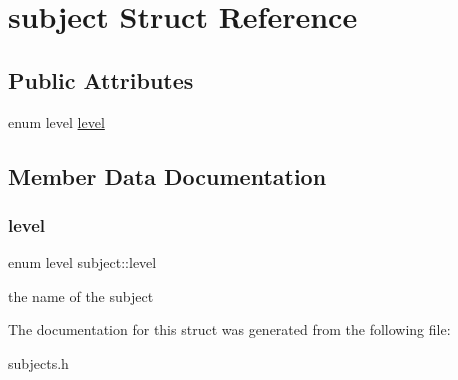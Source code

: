 \hypertarget{structsubject}{}\section{subject Struct Reference}
\label{structsubject}
\subsection*{Public Attributes}
\begin{DoxyCompactItemize}
\item 
enum level \hyperlink{structsubject_a59bfabba13591d841473e9097b309234}{level}
\end{DoxyCompactItemize}


\subsection{Member Data Documentation}
\mbox{\label{structsubject_a59bfabba13591d841473e9097b309234}} 
\subsubsection{\texorpdfstring{level}{level}}
{\footnotesize\ttfamily enum level subject\+::level}

the name of the subject 

The documentation for this struct was generated from the following file\+:\begin{DoxyCompactItemize}
\item 
subjects.\+h\end{DoxyCompactItemize}
